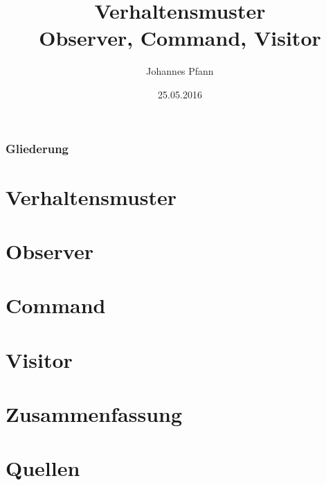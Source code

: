 \documentclass[compress]{beamer}
\author[Johannes Pfann]{%
  Johannes Pfann
}
\date{25.05.2016}
\institute[FAU Erlangen-Nürnberg]{
  Lehrstuhl für Software Engineering\\
  Friedrich-Alexander-Universität Erlangen-Nürnberg
}
\title[Observer, Command, Visitor]{Verhaltensmuster\\Observer, Command, Visitor}
\begin{document}
\frame{\titlepage} 

\begin{frame}
	\frametitle{Gliederung}
	\tableofcontents[hideallsubsections]
\end{frame}


\section[Verhaltensmuster]{Verhaltensmuster}


\section[Observer]{Observer}


\section[Command]{Command}


\section[Visitor]{Visitor}


\section{Zusammenfassung}


\section[Quellen]{Quellen}

\end{document}
